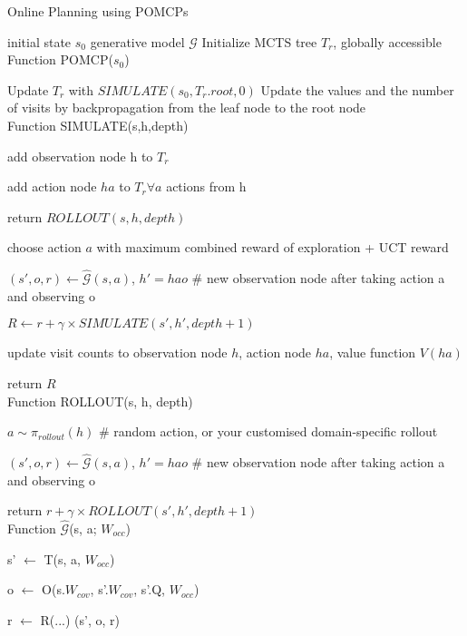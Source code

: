 \begin{algorithm}[t!]
\caption{Online Planning using POMCPs}
\label{alg:pomcp}
\begin{algorithmic}
\REQUIRE initial state $s_0$
\REQUIRE generative model $\mathcal{G}$
\STATE Initialize MCTS tree $T_r$, globally accessible
\STATE Function POMCP($s_0$)
    \item Update $T_r$ with $SIMULATE(s_0, T_r.root, 0)$
    \STATE Update the values and the number of visits by backpropagation from the leaf node to the root node
  \ENDWHILE
\\  
\STATE Function SIMULATE(s,h,depth)
        \item add observation node h to $T_r$
        \item add action node $ha$ to $T_r \forall a$ actions from h
        \item return $ROLLOUT(s, h, depth)$
    \ENDIF
    \item choose action $a$ with maximum combined reward of exploration + UCT reward
    \item $(s', o, r) \gets \hat{\mathcal{G}}(s,a)$, $h' = hao$ \# new observation node after taking action a and observing o
    \item $R \gets r + \gamma\times SIMULATE(s', h', depth+1) $
    \item update visit counts to observation node $h$, action node $ha$, value function $V(ha)$
    \item return $R$
\ENDWHILE
\\
\STATE Function ROLLOUT(s, h, depth)
    \item $a \sim \pi_{rollout}(h)$ \# random action, or your customised domain-specific rollout
    \item $(s', o, r) \gets \hat{\mathcal{G}}(s,a)$, $h' = hao$ \# new observation node after taking action a and observing o
    \item return $r + \gamma \times ROLLOUT(s', h', depth+1)$
\\
\STATE Function $\hat{\mathcal{G}}$(s, a; $W_{occ}$)
    \item s' $\gets$ T(s, a, $W_{occ}$)
    \item o $\gets$ O(s.$W_{cov}$, s'.$W_{cov}$, s'.Q, $W_{occ}$)
    \item r $\gets$ R(...)
    \RETURN (s', o, r)
\ENDWHILE

\end{algorithmic}
\end{algorithm}
